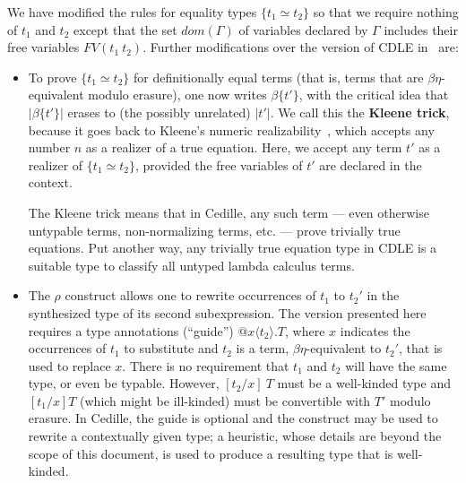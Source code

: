 \documentclass{article}
\begin{document}
We have modified the rules for equality types $\{ t_1 \simeq t_2 \}$ so that we require
nothing of $t_1$ and $t_2$ except that the set $\textit{dom}(\Gamma)$ of variables
declared by $\Gamma$ includes their free variables $\textit{FV}(t_1\ t_2)$.  Further modifications
over the version of CDLE in~\cite{stump18} are:
\begin{itemize}
\item To prove $\{ t_1 \simeq t_2\}$ for definitionally equal terms (that is,
  terms that are \(\beta\eta\)-equivalent modulo erasure), one now writes $\beta\{t'\}$,
  with the critical idea that $|\beta\{t'\}|$ erases to (the possibly unrelated) $|t'|$.
  We call this the \textbf{Kleene trick}, because it goes back to Kleene's numeric
  realizability~\cite{Kle65_Classical-Extensions-of-Intuitionistic-Mathematics},
  which accepts any number $n$ as a realizer 
  of a true equation.  Here, we accept any term $t'$ as a realizer of $\{ t_1
  \simeq t_2\}$, provided the free variables of \(t'\) are declared in the
  context.
  
  The Kleene trick means that in Cedille, any such term --- even otherwise untypable
  terms, non-normalizing terms, etc. --- prove trivially true equations.
  Put another way, any trivially true equation type in CDLE is a suitable type
  to classify all untyped lambda calculus terms.
\item The \(\rho\) construct allows one to rewrite occurrences of \(t_1\) to
  \(t_2'\) in the synthesized type of its second subexpression.
  The version presented here requires a type annotations (``guide'') \(@x\langle
  t_2 \rangle.T\), where \(x\) indicates the occurrences of \(t_1\) to
  substitute and \(t_2\) is a term, \(\beta\eta\)-equivalent to \(t_2'\), that
  is used to replace \(x\).
  There is no requirement that \(t_1\) and \(t_2\) will have the same type, or
  even be typable.
  However, \([t_2/x]\ T\) must be a well-kinded type and \([t_1/x]T\) (which
  might be ill-kinded) must be convertible with \(T'\) modulo erasure.
  In Cedille, the guide is optional and the construct may be used to rewrite a
  contextually given type; a heuristic, whose details are beyond the scope of
  this document, is used to produce a resulting type that is well-kinded.


\end{itemize}
\end{document}
